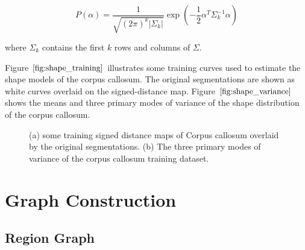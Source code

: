 \documentclass{SMBV12}
\begin{document}
\begin{equation}
P(\alpha) = \dfrac{1}{\sqrt{(2\pi)^k |\Sigma_k|}} \exp\left( -\dfrac{1}{2} \alpha^T \Sigma^{-1}_k \alpha \right) 
\end{equation}

where $\Sigma_k$ contains the first $k$ rows and columns of $\Sigma$.

Figure $\ref{fig:shape_training}$ illustrates some training curves used to estimate the shape models of the corpus callosum. The original segmentations are shown as white curves overlaid on the signed-distance map. Figure $\ref{fig:shape_variance}$ shows the means and three primary modes of variance of the shape distribution of the corpus callosum.

\begin{figure}[htbp]
    \centering
    \caption{(a) some training signed distance maps of Corpus callosum overlaid by the original segmentations. (b) The three primary modes of variance of the corpus callosum training dataset.}
\end{figure}

\section{Graph Construction}



\subsection{Region Graph}
\label{sec:region_graph}
\end{document}
